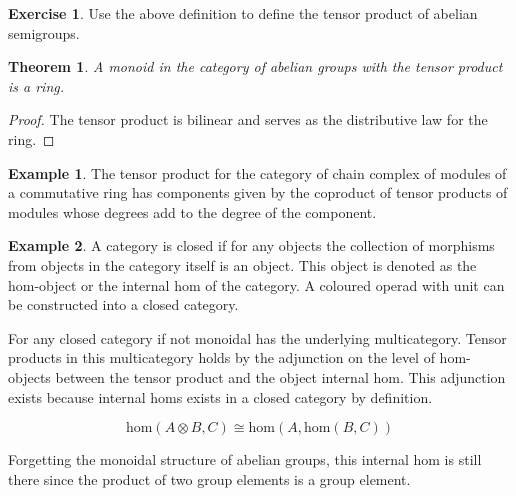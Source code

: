 \documentclass[10pt]{article}
\theoremstyle{plain}%
\newtheorem{theorem}{Theorem}[section]
\theoremstyle{definition}
\newtheorem{example}{Example}[section]
\newtheorem{exercise}{Exercise}[section]
\theoremstyle{remark}
\begin{document}
\begin{exercise}
	Use the above definition to define the tensor product of abelian semigroups.
\end{exercise}

\begin{theorem}
	A monoid in the category of abelian groups with the tensor product is a ring.
\end{theorem}

\begin{proof}
	The tensor product is bilinear and serves as the distributive law for the ring.
\end{proof}

\begin{example}
	The tensor product for the category of chain complex of modules of a commutative ring has components given by the coproduct of tensor products of modules whose degrees add to the degree of the component.
\end{example}

\begin{example}
	A category is closed if for any objects the collection of morphisms from objects in the category itself is an object. This object is denoted as the hom-object or the internal hom of the category. A coloured operad with unit can be constructed into a closed category.

	For any closed category if not monoidal has the underlying multicategory. Tensor products in this multicategory holds by the adjunction on the level of hom-objects between the tensor product and the object internal hom. This adjunction exists because internal homs exists in a closed category by definition.
	
	\begin{equation}
		\mathrm{hom}(A \otimes B, C)
		\cong
		\mathrm{hom}(A, \mathrm{hom}(B,C))
	\end{equation}

	Forgetting the monoidal structure of abelian groups, this internal hom is still there since the product of two group elements is a group element.
\end{example}
\end{document}
